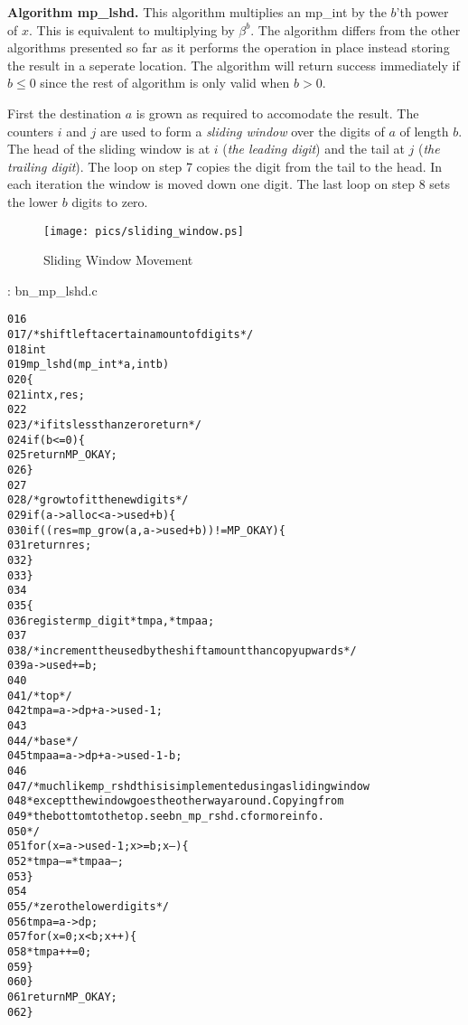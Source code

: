 \documentclass[b5paper]{book}
\begin{document}
\textbf{Algorithm mp\_lshd.}
This algorithm multiplies an mp\_int by the $b$'th power of $x$.  This is equivalent to multiplying by $\beta^b$.  The algorithm differs 
from the other algorithms presented so far as it performs the operation in place instead storing the result in a seperate location.  The algorithm
will return success immediately if $b \le 0$ since the rest of algorithm is only valid when $b > 0$.  

First the destination $a$ is grown as required to accomodate the result.  The counters $i$ and $j$ are used to form a \textit{sliding window} over
the digits of $a$ of length $b$.  The head of the sliding window is at $i$ (\textit{the leading digit}) and the tail at $j$ (\textit{the trailing digit}).  
The loop on step 7 copies the digit from the tail to the head.  In each iteration the window is moved down one digit.   The last loop on 
step 8 sets the lower $b$ digits to zero.

\newpage
\begin{center}
\begin{figure}[here]
\texttt{[image: pics/sliding\_window.ps]}
\caption{Sliding Window Movement}
\end{figure}
\end{center}

\vspace{+3mm}\begin{small}
\hspace{-5.1mm}{\bf File}: bn\_mp\_lshd.c
\vspace{-3mm}
\begin{alltt}
016   
017   /* shift left a certain amount of digits */
018   int
019   mp_lshd (mp_int * a, int b)
020   \{
021     int     x, res;
022   
023     /* if its less than zero return */
024     if (b <= 0) \{
025       return MP_OKAY;
026     \}
027   
028     /* grow to fit the new digits */
029     if (a->alloc < a->used + b) \{
030        if ((res = mp_grow (a, a->used + b)) != MP_OKAY) \{
031          return res;
032        \}
033     \}
034   
035     \{
036       register mp_digit *tmpa, *tmpaa;
037   
038       /* increment the used by the shift amount than copy upwards */
039       a->used += b;
040   
041       /* top */
042       tmpa = a->dp + a->used - 1;
043   
044       /* base */
045       tmpaa = a->dp + a->used - 1 - b;
046   
047       /* much like mp_rshd this is implemented using a sliding window
048        * except the window goes the otherway around.  Copying from
049        * the bottom to the top.  see bn_mp_rshd.c for more info.
050        */
051       for (x = a->used - 1; x >= b; x--) \{
052         *tmpa-- = *tmpaa--;
053       \}
054   
055       /* zero the lower digits */
056       tmpa = a->dp;
057       for (x = 0; x < b; x++) \{
058         *tmpa++ = 0;
059       \}
060     \}
061     return MP_OKAY;
062   \}
\end{alltt}
\end{small}
\end{document}
